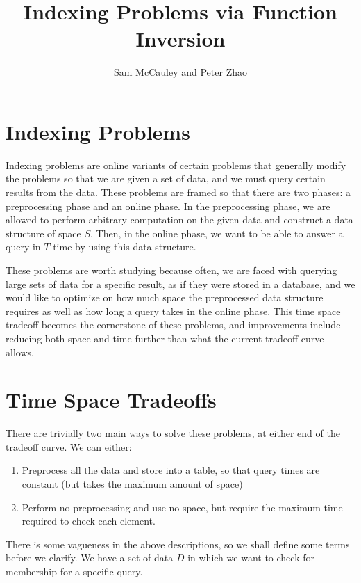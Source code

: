 \documentclass{article}
\title{Indexing Problems via Function Inversion}
\author{Sam McCauley and Peter Zhao}
\date{}
\begin{document}
\maketitle

\section{Indexing Problems}
\label{sec:indexing}
Indexing problems are online variants of certain problems that generally modify the problems so that we are given a set of data, and we must query certain results from the data. These problems are framed so that there are two phases: a preprocessing phase and an online phase. In the preprocessing phase, we are allowed to perform arbitrary computation on the given data and construct a data structure of space $S$. Then, in the online phase, we want to be able to answer a query in $T$ time by using this data structure.

These problems are worth studying because often, we are faced with querying large sets of data for a specific result, as if they were stored in a database, and we would like to optimize on how much space the preprocessed data structure requires as well as how long a query takes in the online phase. This time space tradeoff becomes the cornerstone of these problems, and improvements include reducing both space and time further than what the current tradeoff curve allows.

\section{Time Space Tradeoffs}
\label{sec:tradeoffs}
There are trivially two main ways to solve these problems, at either end of the tradeoff curve. We can either:
\begin{enumerate}
    \item Preprocess all the data and store into a table, so that query times are constant (but takes the maximum amount of space)
    \item Perform no preprocessing and use no space, but require the maximum time required to check each element.
\end{enumerate}
There is some vagueness in the above descriptions, so we shall define some terms before we clarify. We have a set of data $D$ in which we want to check for membership for a specific query. 
\end{document}
